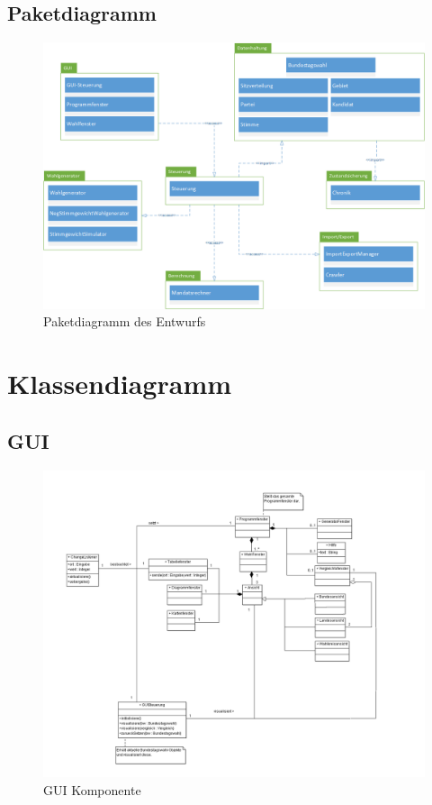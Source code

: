 \documentclass[12pt,a4paper,titlepage]{article}
\begin{document}
\subsection{Paketdiagramm}
\begin{figure}[!ht]
\centering
\includegraphics[scale=0.6]{Paketdiagramm} \caption{Paketdiagramm des Entwurfs}
\end{figure}

\newpage
\section{Klassendiagramm}
\subsection{GUI}
\begin{figure}[!ht]
\includegraphics[scale=0.4]{GUI-Abschnitt.png} \caption{GUI Komponente} 
\end{figure}
\end{document}
